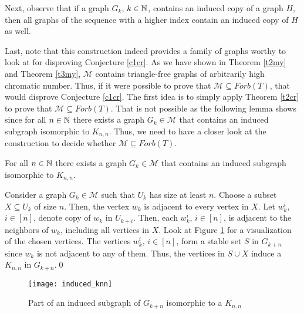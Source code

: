 Next, observe that if a graph $G_k$, $k\in\mathbb{N}$, contains an induced copy of a graph $H$, then all graphs of the sequence with a higher index contain an induced copy of $H$ as well.

Last, note that this construction indeed provides a family of graphs worthy to look at for disproving Conjecture \ref{c1cr}. As we have shown in Theorem \ref{t2my} and Theorem \ref{t3my}, $\mathcal{M}$ contains triangle-free graphs of arbitrarily high chromatic number. Thus, if it were possible to prove that $\mathcal{M}\subseteq\textit{Forb}(T)$, that would disprove Conjecture \ref{c1cr}. The first idea is to simply apply Theorem \ref{t2cr} to prove that $\mathcal{M}\subseteq\textit{Forb}(T)$. That is not possible as the following lemma shows since for all $n\in\mathbb{N}$ there exists a graph $G_k\in\mathcal{M}$ that contains an induced subgraph isomorphic to $K_{n,n}$. Thus, we need to have a closer look at the construction to decide whether $\mathcal{M}\subseteq\textit{Forb}(T)$. 

\begin{lemma}\label{l1my}
For all $n\in\mathbb{N}$ there exists a graph $G_k\in\mathcal{M}$ that contains an induced subgraph isomorphic to $K_{n,n}$.
\end{lemma}
\begin{prf}
Consider a graph $G_k\in\mathcal{M}$ such that $U_k$ has size at least $n$. Choose a subset $X\subseteq U_k$ of size $n$. Then, the vertex $w_k$ is adjacent to every vertex in $X$. Let $w_k^{i}$, $i\in [n]$, denote copy of $w_k$ in $U_{k+i}$. Then, each $w_k^{i}$, $i\in [n]$, is adjacent to the neighbors of $w_k$, including all vertices in $X$. Look at Figure \ref{f3my} for a visualization of the chosen vertices. The vertices $w_k^{i}$, $i\in [n]$, form a stable set $S$ in $G_{k+n}$ since $w_k$ is not adjacent to any of them. Thus, the vertices in $S\cup X$ induce a $K_{n,n}$ in $G_{k+n}$.\qed
\end{prf}

\begin{figure}[ht]
\begin{center}
\texttt{[image: induced\_knn]}
\end{center}
\caption{Part of an induced subgraph of $G_{k+n}$ isomorphic to a $K_{n,n}$}
\label{f3my}
\end{figure}

